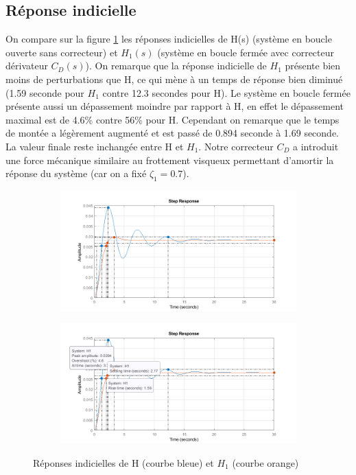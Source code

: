 \documentclass{article}
\begin{document}
\subsection{Réponse indicielle}
On compare sur la figure \ref{fig:step323} les réponses indicielles de H(s) (système en boucle ouverte sans correcteur) et $H_1(s)$ (système en boucle fermée avec correcteur dérivateur $C_D(s)$). On remarque que la réponse indicielle de $H_1$ présente bien moins de perturbations que H, ce qui mène à un temps de réponse bien diminué (1.59 seconde pour $H_1$ contre 12.3 secondes pour H). Le système en boucle fermée présente aussi un dépassement moindre par rapport à H, en effet le dépassement maximal est de 4.6\% contre 56\% pour H. Cependant on remarque que le temps de montée a légèrement augmenté et est passé de 0.894 seconde à 1.69 seconde. La valeur finale reste inchangée entre H et $H_1$. Notre correcteur $C_D$ a introduit une force mécanique similaire au frottement visqueux permettant d'amortir la réponse du système (car on a fixé $\zeta_1 = 0.7$).
\begin{figure}[h]
    \centering
    \begin{subfigure}{\textwidth}
        \centering
        \includegraphics[width=\textwidth]{step323.png}
    \end{subfigure}
    \hfill
    \begin{subfigure}{\textwidth}
        \centering
        \includegraphics[width=\textwidth]{step323_d.png}
    \end{subfigure}
    \caption{Réponses indicielles de H (courbe bleue) et $H_1$ (courbe orange)}
    \label{fig:step323}
\end{figure}
\end{document}
